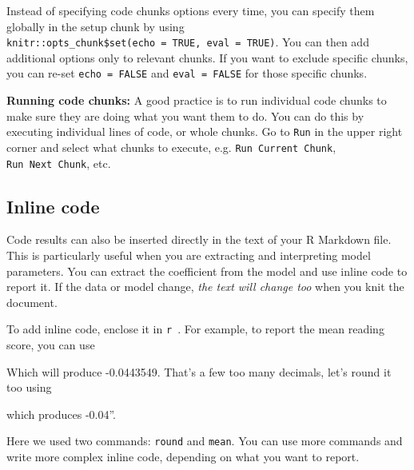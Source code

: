\documentclass[
  letterpaper,
  DIV=11,
  numbers=noendperiod]{scrreprt}
\newenvironment{Shaded}{\begin{snugshade}}{\end{snugshade}}
\newcommand{\AttributeTok}[1]{\textcolor[rgb]{0.49,0.56,0.16}{#1}}
\newcommand{\StringTok}[1]{\textcolor[rgb]{0.25,0.44,0.63}{#1}}
\begin{document}
Instead of specifying code chunks options every time, you can specify
them globally in the setup chunk by using
\texttt{knitr::opts\_chunk\$set(echo\ =\ TRUE,\ eval\ =\ TRUE)}. You can
then add additional options only to relevant chunks. If you want to
exclude specific chunks, you can re-set \texttt{echo\ =\ FALSE} and
\texttt{eval\ =\ FALSE} for those specific chunks.

\textbf{Running code chunks:} A good practice is to run individual code
chunks to make sure they are doing what you want them to do. You can do
this by executing individual lines of code, or whole chunks. Go to
\texttt{Run} in the upper right corner and select what chunks to
execute, e.g. \texttt{Run\ Current\ Chunk}, \texttt{Run\ Next\ Chunk},
etc.

\hypertarget{inline-code}{%
\subsection{Inline code}\label{inline-code}}

Code results can also be inserted directly in the text of your R
Markdown file. This is particularly useful when you are extracting and
interpreting model parameters. You can extract the coefficient from the
model and use inline code to report it. If the data or model change,
\emph{the text will change too} when you knit the document.

To add inline code, enclose it in
\texttt{\textasciigrave{}r\ \textasciigrave{}}. For example, to report
the mean reading score, you can use

\begin{Shaded}
\end{Shaded}

Which will produce -0.0443549. That's a few too many decimals, let's
round it too using

\begin{Shaded}
\end{Shaded}

which produces -0.04''.

Here we used two commands: \texttt{round} and \texttt{mean}. You can use
more commands and write more complex inline code, depending on what you
want to report.
\end{document}
